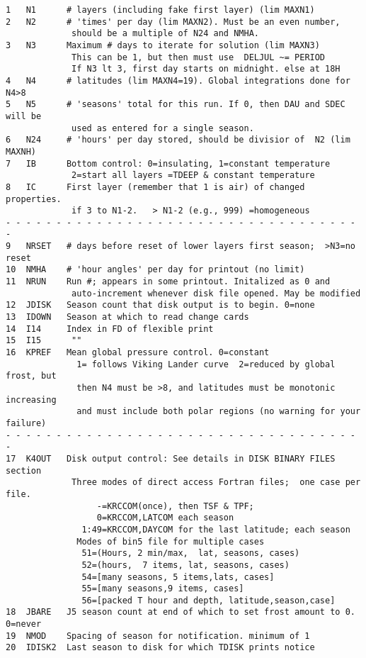 \documentclass[draft]{article}  %
\begin{document}
\begin{verbatim}
1   N1      # layers (including fake first layer) (lim MAXN1)
2   N2      # 'times' per day (lim MAXN2). Must be an even number, 
             should be a multiple of N24 and NMHA.
3   N3      Maximum # days to iterate for solution (lim MAXN3)
             This can be 1, but then must use  DELJUL ~= PERIOD
             If N3 lt 3, first day starts on midnight. else at 18H 
4   N4      # latitudes (lim MAXN4=19). Global integrations done for N4>8
5   N5      # 'seasons' total for this run. If 0, then DAU and SDEC will be 
             used as entered for a single season.
6   N24     # 'hours' per day stored, should be divisior of  N2 (lim MAXNH)
7   IB      Bottom control: 0=insulating, 1=constant temperature 
             2=start all layers =TDEEP & constant temperature 
8   IC      First layer (remember that 1 is air) of changed properties. 
             if 3 to N1-2.   > N1-2 (e.g., 999) =homogeneous
- - - - - - - - - - - - - - - - - - - - - - - - - - - - - - - - - - - - 
9   NRSET   # days before reset of lower layers first season;  >N3=no reset
10  NMHA    # 'hour angles' per day for printout (no limit)
11  NRUN    Run #; appears in some printout. Initalized as 0 and   
             auto-increment whenever disk file opened. May be modified
12  JDISK   Season count that disk output is to begin. 0=none
13  IDOWN   Season at which to read change cards
14  I14     Index in FD of flexible print
15  I15      ""
16  KPREF   Mean global pressure control. 0=constant
              1= follows Viking Lander curve  2=reduced by global frost, but
              then N4 must be >8, and latitudes must be monotonic increasing
              and must include both polar regions (no warning for your failure)
- - - - - - - - - - - - - - - - - - - - - - - - - - - - - - - - - - - - 
17  K4OUT   Disk output control: See details in DISK BINARY FILES section
             Three modes of direct access Fortran files;  one case per file.
                  -=KRCCOM(once), then TSF & TPF;
                  0=KRCCOM,LATCOM each season
               1:49=KRCCOM,DAYCOM for the last latitude; each season
              Modes of bin5 file for multiple cases
               51=(Hours, 2 min/max,  lat, seasons, cases)
               52=(hours,  7 items, lat, seasons, cases)
               54=[many seasons, 5 items,lats, cases]
               55=[many seasons,9 items, cases]
               56=[packed T hour and depth, latitude,season,case]
18  JBARE   J5 season count at end of which to set frost amount to 0. 0=never
19  NMOD    Spacing of season for notification. minimum of 1
20  IDISK2  Last season to disk for which TDISK prints notice

\end{verbatim}
\end{document}
